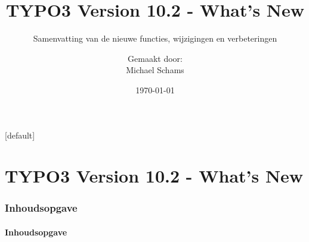 \documentclass[t]{beamer}
\title{TYPO3 Version 10.2 - What's New}
\subtitle{Samenvatting van de nieuwe functies, wijzigingen en verbeteringen}
\author{
	\centerline{Gemaakt door:}
	\centerline{Michael Schams}
}
\date{\today}
\begin{document}
\sharefont


\begingroup
	[default]
	\begin{frame}
		\titlepage
	\end{frame}
\endgroup


\section*{TYPO3 Version 10.2 - What's New}
\begin{frame}[fragile]
	\frametitle{Inhoudsopgave}
	\framesubtitle{Inhoudsopgave}

	\tableofcontents

\end{frame}











%

\end{document}
